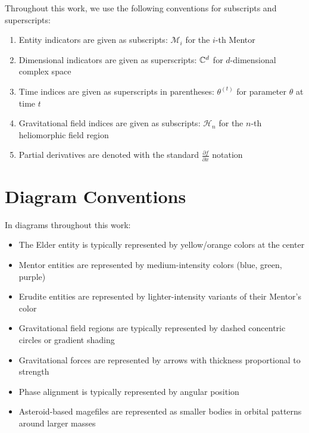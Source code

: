 Throughout this work, we use the following conventions for subscripts and superscripts:

\begin{enumerate}
    \item Entity indicators are given as subscripts: $\mathcal{M}_i$ for the $i$-th Mentor
    \item Dimensional indicators are given as superscripts: $\mathbb{C}^{d}$ for $d$-dimensional complex space
    \item Time indices are given as superscripts in parentheses: $\theta^{(t)}$ for parameter $\theta$ at time $t$
    \item Gravitational field indices are given as subscripts: $\mathcal{H}_n$ for the $n$-th heliomorphic field region
    \item Partial derivatives are denoted with the standard $\frac{\partial f}{\partial x}$ notation
\end{enumerate}

\newpage
\section*{Diagram Conventions}

In diagrams throughout this work:

\begin{itemize}
    \item The Elder entity is typically represented by yellow/orange colors at the center
    \item Mentor entities are represented by medium-intensity colors (blue, green, purple)
    \item Erudite entities are represented by lighter-intensity variants of their Mentor's color
    \item Gravitational field regions are typically represented by dashed concentric circles or gradient shading
    \item Gravitational forces are represented by arrows with thickness proportional to strength
    \item Phase alignment is typically represented by angular position
    \item Asteroid-based magefiles are represented as smaller bodies in orbital patterns around larger masses
\end{itemize}